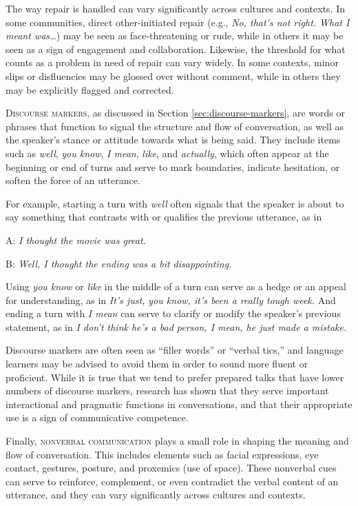 The way repair is handled can vary significantly across cultures and contexts. In some communities, direct other-initiated repair (e.g., \textit{No, that's not right. What I meant was\dots}) may be seen as face-threatening or rude, while in others it may be seen as a sign of engagement and collaboration. Likewise, the threshold for what counts as a problem in need of repair can vary widely. In some contexts, minor slips or disfluencies may be glossed over without comment, while in others they may be explicitly flagged and corrected.

\textsc{Discourse markers}, as discussed in Section \ref{sec:discourse-markers}, are words or phrases that function to signal the structure and flow of conversation, as well as the speaker's stance or attitude towards what is being said. They include items such as \textit{well}, \textit{you know}, \textit{I mean}, \textit{like}, and \textit{actually}, which often appear at the beginning or end of turns and serve to mark boundaries, indicate hesitation, or soften the force of an utterance.

For example, starting a turn with \textit{well} often signals that the speaker is about to say something that contrasts with or qualifies the previous utterance, as in 

A: \textit{I thought the movie was great. }

B: \textit{Well, I thought the ending was a bit disappointing.}

Using \textit{you know} or \textit{like} in the middle of a turn can serve as a hedge or an appeal for understanding, as in \textit{It's just, you know, it's been a really tough week.} And ending a turn with \textit{I mean} can serve to clarify or modify the speaker's previous statement, as in \textit{I don't think he's a bad person, I mean, he just made a mistake.}

Discourse markers are often seen as ``filler words'' or ``verbal tics,'' and language learners may be advised to avoid them in order to sound more fluent or proficient. While it is true that we tend to prefer prepared talks that have lower numbers of discourse markers, research has shown that they serve important interactional and pragmatic functions in conversations, and that their appropriate use is a sign of communicative competence.

Finally, \textsc{nonverbal communication} plays a small role in shaping the meaning and flow of conversation. This includes elements such as facial expressions, eye contact, gestures, posture, and proxemics (use of space). These nonverbal cues can serve to reinforce, complement, or even contradict the verbal content of an utterance, and they can vary significantly across cultures and contexts.


